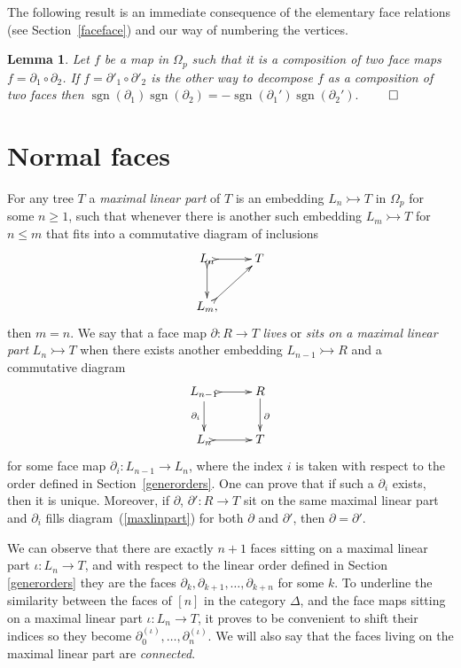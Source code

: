 \documentclass[a4paper]{amsart}
\theoremstyle{plain}
\newtheorem{lem}[thm]{Lemma}
\theoremstyle{definition}
\theoremstyle{remark}
\DeclareMathOperator{\sgn}{sgn}
\newcommand{\rpd}{\Omega_p}
\newcommand{\To}{\longrightarrow}
\numberwithin{equation}{section}
\numberwithin{figure}{section}
\begin{document}
The following result is an immediate consequence of the elementary face relations (see Section~\ref{faceface}) and our
way of numbering the vertices.
\begin{lem}\label{decomp}
Let $f$ be a map in $\rpd$ such that it is a composition of two face maps $f=\partial_1\circ\partial_2$.
If $f=\partial'_1\circ\partial'_2$ is the other way to decompose $f$ as a composition of two faces then
$\sgn(\partial_1)\sgn(\partial_2)=-\sgn(\partial_1')\sgn(\partial_2').$
$\hfill\qed$
\end{lem}

\section{Normal faces}
For any tree $T$ a \emph{maximal linear part} of $T$ is an embedding $L_n\rightarrowtail T$
in $\rpd$ for some $n\ge 1$, such that whenever there is another such embedding $L_m\rightarrowtail T$ for $n\le m$ that fits into a commutative diagram of inclusions
$$
\xymatrix{L_n\ar@{>->}[r]\ar@{>->}[d]&T\\
L_m,\ar@{>->}[ru]}
$$
then $m=n$. We say that a face map $\partial\colon R\To T$ \emph{lives} or \emph{sits on a maximal linear part}
$L_n\rightarrowtail T$ when there exists another embedding $L_{n-1}\rightarrowtail R$ and a commutative diagram
\begin{equation}
\label{maxlinpart}
\xymatrix{L_{n-1}\ar@{>->}[r]\ar[d]_{\partial_i} &R\ar[d]^\partial\\
L_{n}\ar@{>->}[r] & T}
\end{equation}
for some face map $\partial_i:L_{n-1}\longrightarrow  L_n$, where the index $i$ is taken with respect to the order defined in
Section~\ref{generorders}. One can prove that if such a $\partial_i$ exists, then it is unique. Moreover, if $\partial$, $\partial'\colon R\To T$ sit on the same maximal linear part and $\partial_i$ fills diagram~(\ref{maxlinpart}) for both $\partial$ and $\partial'$, then $\partial=\partial'$.

We can observe that there are exactly $n+1$ faces sitting on a maximal linear part $\iota\colon L_n\To T$, and with respect to the linear order defined in Section \ref{generorders} they are the faces $\partial_k, \partial_{k+1},\ldots,\partial_{k+n}$ for some $k$. To underline the similarity between the faces of $[n]$ in the category $\Delta$, and the face maps sitting on a maximal linear part $\iota\colon L_n\To T$, it proves to be convenient to shift their indices so they become $\partial^{(\iota)}_0,\ldots, \partial^{(\iota)}_n$. We will also say that the faces living on
the maximal linear part are \emph{connected}.
\end{document}
